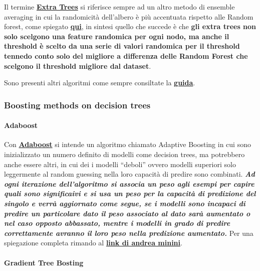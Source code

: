 \documentclass[11pt]{article}
\begin{document}
Il termine
\textbf{\href{https://scikit-learn.org/stable/modules/ensemble.html\#forest}{Extra
Trees}} si riferisce sempre ad un altro metodo di ensemble averaging in
cui la randomicità dell'albero è più accentuata rispetto alle Random
forest, come spiegato
\textbf{\href{https://quantdare.com/what-is-the-difference-between-extra-trees-and-random-forest/}{qui}},
in sintesi quello che succede è che \textbf{gli extra trees non solo
scelgono una feature randomica per ogni nodo, ma anche il threshold è
scelto da una serie di valori randomica per il threshold tennedo conto
solo del migliore a differenza delle Random Forest che scelgono il
threshold migliore dal dataset}.

Sono presenti altri algoritmi come sempre consiltate la
\textbf{\href{https://scikit-learn.org/stable/modules/ensemble.html\#forest}{guida}}.

\hypertarget{boosting-methods-on-decision-trees}{%
\subsubsection{Boosting methods on decision
trees}\label{boosting-methods-on-decision-trees}}

\hypertarget{adaboost}{%
\paragraph{Adaboost}\label{adaboost}}

Con
\textbf{\href{https://scikit-learn.org/stable/modules/ensemble.html\#adaboost}{Adaboost}}
si intende un algoritmo chiamato Adaptive Boosting in cui sono
inizializzato un numero definito di modelli come decision trees, ma
potrebbero anche essere altri, in cui dei i modelli ``deboli'' ovvero
modelli superiori solo leggermente al random guessing nella loro
capacità di predire sono combinati. \textbf{\emph{Ad ogni iterazione
dell'algoritmo si associa un peso agli esempi per capire quali sono
significaivi e si usa un peso per la capacità di predizione del singolo
e verrà aggiornato come segue, se i modelli sono incapaci di predire un
particolare dato il peso associato al dato sarà aumentato o nel caso
opposto abbassato, mentre i modelli in grado di predire correttamente
avranno il loro peso nella predizione aumentato.}} Per una spiegazione
completa rimando al
\textbf{\href{http://www.andreaminini.com/ai/machine-learning/adaboost}{link
di andrea minini}}.

\hypertarget{gradient-tree-bosting}{%
\paragraph{Gradient Tree Bosting}\label{gradient-tree-bosting}}
\end{document}
